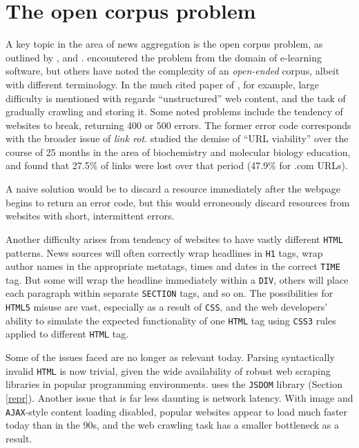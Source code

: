 \section{The open corpus problem}

A key topic in the area of news aggregation is the open
corpus problem, as outlined by \cite{henze2001},
 and  . 
encountered the problem from the domain of e-learning
software, but others have noted the complexity of an
{\it open-ended} corpus, albeit with different terminology.
In the much cited paper of , for example,
large difficulty is mentioned with regards ``unstructured''
web content, and the task of gradually crawling and storing
it.  Some noted problems include the tendency of websites to
break, returning 400 or 500 errors.  The former error code
corresponds with the broader issue of {\it link rot}.
 studied the demise of ``URL viability''
over the course of 25 months in the area of
biochemistry and molecular biology education, and found that
27.5\% of links were lost over that period (47.9\% for .com
URLs).

A naive solution would be to discard a resource immediately
after the webpage begins to return an error code, but this
would erroneously discard resources from websites with
short, intermittent errors.

Another difficulty arises from tendency of websites to have
vastly different {\tt HTML} patterns.  News sources will often correctly
wrap headlines in {\tt H1} tags, wrap author names in the
appropriate metatags, times and dates in the correct {\tt TIME} tag.
But some will wrap the headline immediately within a {\tt DIV},
others will place each paragraph within separate {\tt SECTION} tags, and
so on. The possibilities for {\tt HTML5} misuse are vast, especially
as a result of {\tt CSS}, and the web developers' ability to
simulate the expected functionality of one {\tt HTML} tag using
{\tt CSS3} rules applied to different {\tt HTML} tag.

Some of the issues  faced are no longer as
relevant today.  Parsing syntactically invalid {\tt HTML} is
now trivial, given the wide availability of robust web scraping
libraries in popular programming environments.
\nr{} uses the {\tt JSDOM} library (Section \ref{repr}).  Another
issue that is far less daunting is network latency. With image and
{\tt AJAX}-style content loading disabled, popular websites
appear to load much faster today than in the 90s, and
the web crawling task has a smaller bottleneck as a result.

